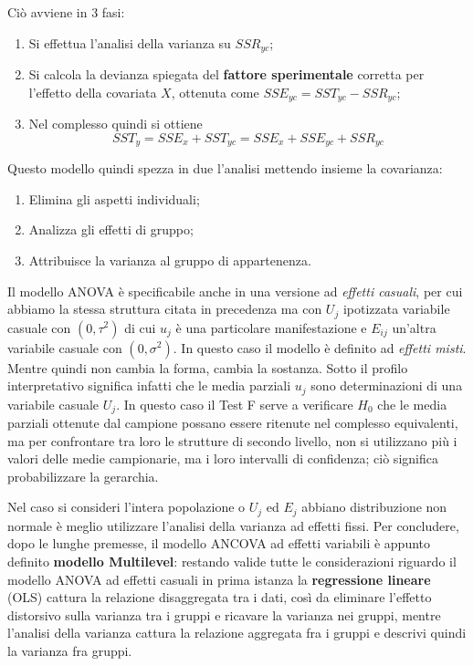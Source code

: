\documentclass[a4page, 11pt]{article} %
\begin{document}
Ciò avviene in 3 fasi:
\begin{enumerate}
\item Si effettua l'analisi della varianza su $SSR_{yc}$;
\item Si calcola la devianza spiegata del \textbf{fattore sperimentale} corretta per l'effetto della covariata $X$, ottenuta come $SSE_{yc} = SST_{yc}-SSR_{yc}$;
\item Nel complesso quindi si ottiene
\begin{equation*}
SST_y = SSE_x + SST_{yc} = SSE_x + SSE_{yc} + SSR_{yc}
\end{equation*}
\end{enumerate}
Questo modello quindi spezza in due l’analisi mettendo insieme la covarianza:
\begin{enumerate}
\item Elimina gli aspetti individuali; 
\item Analizza gli effetti di gruppo;
\item Attribuisce la varianza al gruppo di appartenenza.
\end{enumerate}
Il modello ANOVA è specificabile anche in una versione ad \textit{effetti casuali}, per cui abbiamo la stessa struttura citata in precedenza ma con $U_j$ ipotizzata variabile casuale con $(0, \tau^2)$ di cui $u_j$ è una particolare manifestazione e $E_{ij}$ un'altra variabile casuale con $(0,\sigma^2)$. In questo caso il modello è definito ad \textit{effetti misti}. Mentre quindi non cambia la forma, cambia la sostanza. Sotto il profilo interpretativo significa infatti che le media parziali $u_j$ sono determinazioni di una variabile casuale $U_j$. In questo caso il Test F serve a verificare $H_0$ che le media parziali ottenute dal campione possano essere ritenute nel complesso equivalenti, ma per confrontare tra loro le strutture di secondo livello, non si utilizzano più i valori delle medie campionarie, ma i loro intervalli di confidenza; ciò significa probabilizzare la gerarchia.

Nel caso si consideri l'intera popolazione o $U_j$ ed $E_j$ abbiano distribuzione non normale è meglio utilizzare l'analisi della varianza ad effetti fissi.
\newline
\newline
Per concludere, dopo le lunghe premesse, il modello ANCOVA ad effetti variabili è appunto definito \textbf{modello Multilevel}: restando valide tutte le considerazioni riguardo il modello ANOVA ad effetti casuali in prima istanza la \textbf{regressione lineare} (OLS) cattura la relazione disaggregata tra i dati, così da eliminare l'effetto distorsivo sulla varianza tra i gruppi e ricavare la varianza nei gruppi, mentre l'analisi della varianza cattura la relazione aggregata fra i gruppi e descrivi quindi la varianza fra  gruppi.
\end{document}
